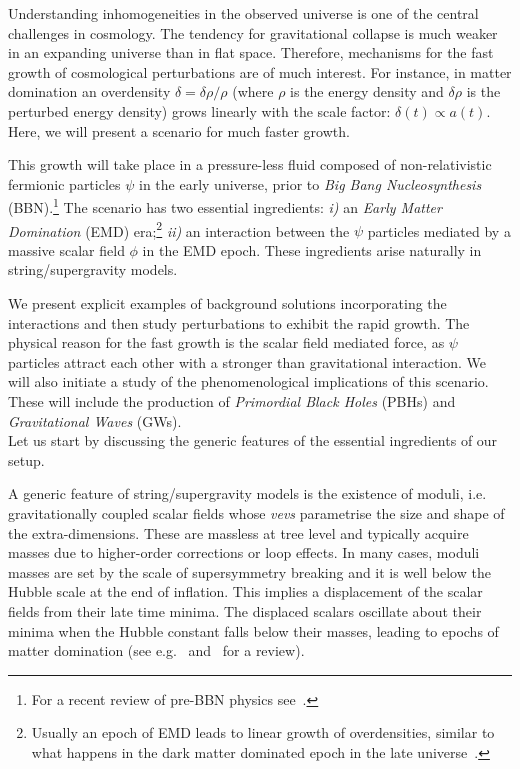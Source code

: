 \documentclass[a4paper, amsfonts, amssymb, amsmath, reprint, showkeys, nofootinbib, twoside, superscriptaddress]{revtex4-1}
\begin{document}
\label{sec:intro}
Understanding inhomogeneities in the observed universe is one of the central challenges in cosmology. The tendency for gravitational collapse is much weaker in an expanding universe than in flat space. Therefore, mechanisms for the fast growth of cosmological perturbations are of much interest. For instance, in matter domination an overdensity $\delta = \delta\rho/\rho$ (where $\rho$ is the energy density and $\delta\rho$ is the perturbed energy density) grows linearly with the scale factor: $\delta(t) \propto a(t)$. Here, we will present a scenario for much faster growth.

This growth will take place in a pressure-less fluid composed of non-relativistic fermionic particles $\psi$ in the early universe, prior to \textit{Big Bang Nucleosynthesis} (BBN).\footnote{For a recent review of pre-BBN physics see~\cite{Allahverdi:2020bys}.} The scenario has two essential ingredients: \textit{i)} an \textit{Early Matter Domination} (EMD) era;\footnote{Usually an epoch of EMD leads to linear growth of overdensities, similar to what happens in the dark matter dominated epoch in the late universe~\cite{Georg:2016yxa, Georg:2017mqk, Erickcek:2011us, Redmond:2018xty}.} \textit{ii)} an interaction between the $\psi$ particles mediated by a massive scalar field $\phi$ in the EMD epoch. These ingredients arise naturally in string/supergravity models.

We present explicit examples of background solutions incorporating the interactions and then study perturbations to exhibit the rapid growth. The physical reason for the fast growth is the scalar field mediated force, as $\psi$ particles attract each other with a stronger than gravitational interaction. We will also initiate a study of the phenomenological implications of this scenario. These will include the production of \textit{Primordial Black Holes} (PBHs) and \textit{Gravitational Waves} (GWs).\\

Let us start by discussing the generic features of the essential ingredients of our setup.\\
 

A generic feature of string/supergravity models is the existence of moduli, i.e. gravitationally coupled scalar fields whose \textit{vevs} parametrise the size and shape of the extra-dimensions. These are massless at tree level and typically acquire masses due to higher-order corrections or loop effects. In many cases, moduli masses are set by the scale of supersymmetry breaking and it is well below the Hubble scale at the end of inflation. This implies a displacement of the scalar fields from their late time minima. The displaced scalars oscillate about their minima when the Hubble constant falls below their masses, leading to epochs of matter domination (see e.g.~\cite{Coughlan:1983ci, hep-ph/9308292, hep-ph/9308325, hep-ph/9507453, Cicoli:2016olq,  1906.03025, Erickcek:2011us}  and~\cite{1502.07746} for a review). 
\end{document}
